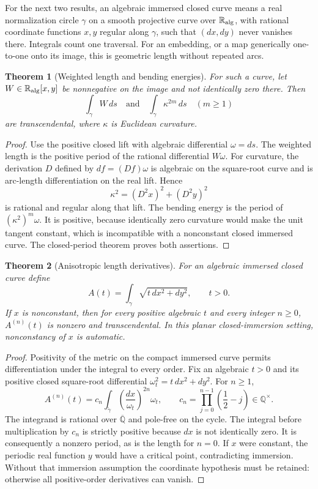 \documentclass[11pt,a4paper]{article}
\newtheorem{theorem}{Theorem}[section]
\theoremstyle{definition}
\theoremstyle{remark}
\numberwithin{equation}{section}
\newcommand{\Qbar}{\overline{\mathbb Q}}
\begin{document}
For the next two results, an algebraic immersed closed curve means a
real normalization circle $\gamma$ on a smooth projective curve over
$\mathbb R_{\rm alg}$, with rational coordinate functions $x,y$ regular
along $\gamma$, such that $(dx,dy)$ never vanishes there.  Integrals
count one traversal.  For an embedding, or a map generically one-to-one
onto its image, this is geometric length without repeated arcs.

\begin{theorem}[Weighted length and bending energies]\label{lm-weighted}
For such a curve, let $W\in\mathbb R_{\rm alg}[x,y]$ be nonnegative on
the image and not identically zero there.  Then
\[
 \int_\gamma W\,ds
 \quad\text{and}\quad
 \int_\gamma\kappa^{2m}\,ds\quad(m\ge1)
\]
are transcendental, where $\kappa$ is Euclidean curvature.
\end{theorem}

\begin{proof}
Use the positive closed lift with algebraic differential $\omega=ds$.
The weighted length is the positive period of the rational differential
$W\omega$.  For curvature, the derivation $D$ defined by
$df=(Df)\omega$ is algebraic on the square-root curve and is
arc-length differentiation on the real lift.  Hence
\[
 \kappa^2=(D^2x)^2+(D^2y)^2
\]
is rational and regular along that lift.  The bending energy is the
period of $(\kappa^2)^m\omega$.  It is positive, because identically
zero curvature would make the unit tangent constant, which is
incompatible with a nonconstant closed immersed curve.  The
closed-period theorem proves both assertions.
\end{proof}

\begin{theorem}[Anisotropic length derivatives]\label{lm-anisotropic}
For an algebraic immersed closed curve define
\[
 A(t)=\int_\gamma\sqrt{t\,dx^2+dy^2},\qquad t>0.
\]
If $x$ is nonconstant, then for every positive algebraic $t$ and every
integer $n\ge0$, $A^{(n)}(t)$ is nonzero and transcendental.  In this
planar closed-immersion setting, nonconstancy of $x$ is automatic.
\end{theorem}

\begin{proof}
Positivity of the metric on the compact immersed curve permits
differentiation under the integral to every order.  Fix an algebraic
$t>0$ and its positive closed square-root differential
$\omega_t^2=t\,dx^2+dy^2$.  For $n\ge1$,
\begin{equation}\label{lm-anisotropic-formula}
 A^{(n)}(t)=c_n\int_{\widetilde\gamma}
       \left(\frac{dx}{\omega_t}\right)^{2n}\omega_t,
 \qquad c_n=\prod_{j=0}^{n-1}\left(\frac12-j\right)\in\mathbb Q^\times.
\end{equation}
The integrand is rational over $\Qbar$ and pole-free on the cycle.  The
integral before multiplication by $c_n$ is strictly positive because
$dx$ is not identically zero.  It is consequently a nonzero period, as
is the length for $n=0$.  If $x$ were constant, the periodic real
function $y$ would have a critical point, contradicting immersion.
Without that immersion assumption the coordinate hypothesis must be
retained: otherwise all positive-order derivatives can vanish.
\end{proof}
\end{document}

